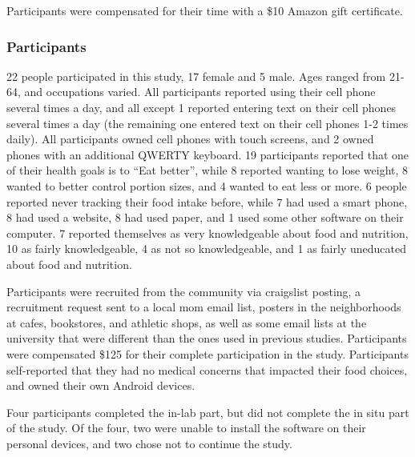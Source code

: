 Participants were compensated for their time with a \$10 Amazon gift certificate.

\subsubsection{Participants}

22 people participated in this study, 17 female and 5 male. Ages ranged from 21-64, and occupations varied. All participants reported using their cell phone several times a day, and all except 1 reported entering text on their cell phones several times a day (the remaining one entered text on their cell phones 1-2 times daily). All participants owned cell phones with touch screens, and 2 owned phones with an additional QWERTY keyboard. 19 participants reported that one of their health goals is to ``Eat better'', while 8 reported wanting to lose weight, 8 wanted to better control portion sizes, and 4 wanted to eat less or more. 6 people reported never tracking their food intake before, while 7 had used a smart phone, 8 had used a website, 8 had used paper, and 1 used some other software on their computer. 7 reported themselves as very knowledgeable about food and nutrition, 10 as fairly knowledgeable, 4 as not so knowledgeable, and 1 as fairly uneducated about food and nutrition.  

Participants were recruited from the community via craigslist posting, a recruitment request sent to a local mom email list, posters in the neighborhoods at cafes, bookstores, and athletic shops, as well as some email lists at the university that were different than the ones used in previous studies. Participants were compensated \$125 for their complete participation in the study. Participants self-reported that they had no medical concerns that impacted their food choices, and owned their own Android devices. 

Four participants completed the in-lab part, but did not complete the in situ part of the study. Of the four, two were unable to install the software on their personal devices, and two chose not to continue the study. 

